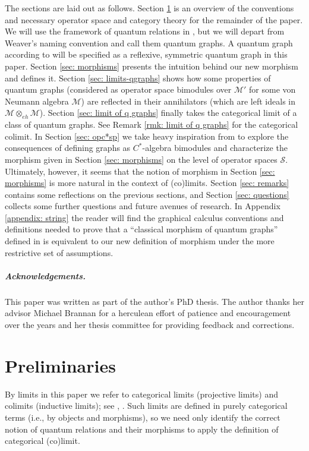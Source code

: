 \documentclass[12pt]{article}
\theoremstyle{definition}
\newcommand{\mc}[1]{\mathcal{#1}}
\newcommand{\<}{\langle}
\renewcommand{\>}{\rangle}
\newcommand{\eh}{\otimes_{eh}}
\begin{document}
The sections are laid out as follows. Section \ref{sec: limits-prelim} is an overview of the conventions and necessary operator space and category theory for the remainder of the paper. We will use the framework of quantum relations in \cite[Definition 2.4]{weaverqrelations}, but we will depart from Weaver's naming convention and call them quantum graphs. A quantum graph according to \cite[Definition 2.4]{weaverqrelations} will be specified as a reflexive, symmetric quantum graph in this paper. Section \ref{sec: morphisms} presents the intuition behind our new morphism and defines it. Section \ref{sec: limits-qgraphs} shows how some properties of quantum graphs (considered as operator space bimodules over $\mc M'$ for some von Neumann algebra $\mc M$) are reflected in their annihilators (which are left ideals in $\mc M \eh \mc M$). Section \ref{sec: limit of q graphs} finally takes the categorical limit of a class of quantum graphs. See Remark \ref{rmk: limit of q graphs} for the categorical colimit. In Section \ref{sec: opc*sp} we take heavy inspiration from \cite{mawtod} to explore the consequences of defining graphs as $C^*$-algebra bimodules and characterize the morphism given in Section \ref{sec: morphisms} on the level of operator spaces $\mc S$. Ultimately, however, it seems that the notion of morphism in Section \ref{sec: morphisms} is more natural in the context of (co)limits. Section \ref{sec: remarks} contains some reflections on the previous sections, and Section \ref{sec: questions} collects some further questions and future avenues of research. In Appendix \ref{appendix: string} the reader will find the graphical calculus conventions and definitions needed to prove that a ``classical morphism of quantum graphs'' defined in \cite[Definition 5.4]{musto-reutter-verdon} is equivalent to our new definition of morphism under the more restrictive set of assumptions.

\subparagraph{Acknowledgements.} This paper was written as part of the author's PhD thesis. The author thanks her advisor Michael Brannan for a herculean effort of patience and encouragement over the years and her thesis committee for providing feedback and corrections.

\section{Preliminaries} \label{sec: limits-prelim}

By limits in this paper we refer to categorical limits (projective limits) and colimits (inductive limits); see \cite[Chapter III.4]{cats-working}, \cite[Chapter III.3]{cats-working}. Such limits are defined in purely categorical terms (i.e., by objects and morphisms), so we need only identify the correct notion of quantum relations and their morphisms to apply the definition of categorical (co)limit. 
\end{document}
